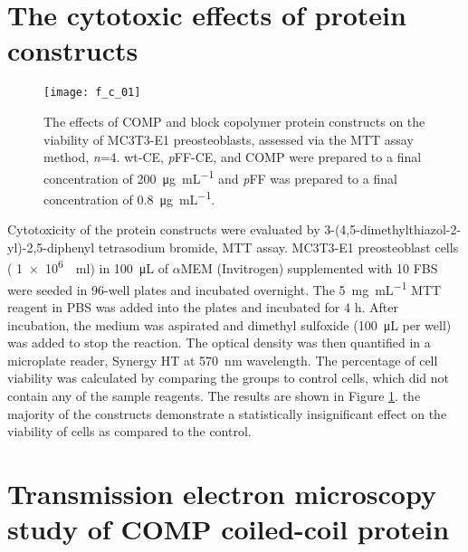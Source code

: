 \section{The cytotoxic effects of protein constructs}
\begin{figure}[h!] \centering \texttt{[image: f\_c\_01]}
    \caption{The effects of COMP and block copolymer protein constructs on the
        viability of MC3T3-E1 preosteoblasts, assessed via the MTT assay method,
        \emph{n}=4. wt-CE, \emph{p}FF-CE, and COMP were prepared to a final
        concentration of \SI{200}{\ug\per\mL} and \emph{p}FF was prepared to a
        final concentration of \SI{0.8}{\ug\per\mL}.}\label{fig:mtt_results}
    \end{figure}
Cytotoxicity of the protein constructs were evaluated by
3-(4,5-dimethylthiazol-2-yl)-2,5-diphenyl tetrasodium bromide, MTT assay.
MC3T3-E1 preosteoblast cells (
\SI[scientific-notation=true,retain-unity-mantissa=true]{1e6}{\per\ml}) in
\SI{100}{\uL} of ${\alpha}$MEM (Invitrogen) supplemented with \SI{10}{\volper}
FBS were seeded in 96-well plates and incubated overnight. The
\SI{5}{\mg\per\mL} MTT reagent in PBS was added into the plates and incubated
for 4 h. After incubation, the medium was aspirated and dimethyl sulfoxide
(\SI{100}{\uL} per well) was added to stop the reaction. The optical density was
then quantified in a microplate reader, Synergy HT at \SI{570}{\nm} wavelength.
The percentage of cell viability was calculated by comparing the groups to
control cells, which did not contain any of the sample reagents. The results are
shown in Figure \ref{fig:mtt_results}. the majority of the constructs
demonstrate a statistically insignificant effect on the viability of cells as
compared to the control.


\section{Transmission electron microscopy study of COMP coiled-coil protein}

